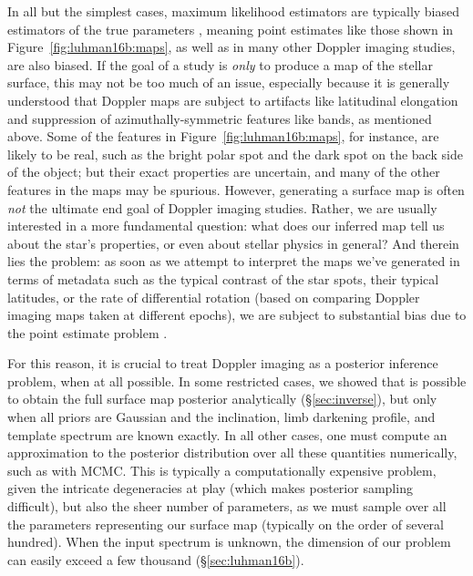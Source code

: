 \documentclass[modern]{aastex631}
\begin{document}
In all but the simplest cases, maximum likelihood estimators are typically biased estimators of the true parameters \citep[e.g.,][]{Lehman1998}, meaning point estimates like those shown in Figure~\ref{fig:luhman16b:maps}, as well as in many other Doppler imaging studies, are also biased.
If the goal of a study is \emph{only} to produce a map of the stellar surface, this may not be too much of an issue, especially because it is generally understood that Doppler maps are subject to artifacts like latitudinal elongation and suppression of azimuthally-symmetric features like bands, as mentioned above.
Some of the features in Figure~\ref{fig:luhman16b:maps}, for instance, are likely to be real, such as the bright polar spot and the dark spot on the back side of the object; but their exact properties are uncertain, and many of the other features in the maps may be spurious.
However, generating a surface map is often \emph{not} the ultimate end goal of Doppler imaging studies.
Rather, we are usually interested in a more fundamental question: what does our inferred map tell us about the star's properties, or even about stellar physics in general?
And therein lies the problem: as soon as we attempt to interpret the maps we've generated in terms of metadata such as the typical contrast of the star spots, their typical latitudes, or  the rate of differential rotation (based on comparing Doppler imaging maps taken at different epochs), we are subject to substantial bias due to the point estimate problem \citep[for an example of this same problem in the context of inferring the exoplanet eccentricity distribution, see][]{Hogg2010}.

For this reason, it is crucial to treat Doppler imaging as a posterior inference problem, when at all possible.
In some restricted cases, we showed that is possible to obtain the full surface map posterior analytically (\S\ref{sec:inverse}), but only when all priors are Gaussian and the inclination, limb darkening profile, and template spectrum are known exactly. 
In all other cases, one must compute an approximation to the posterior distribution over all these quantities numerically, such as with MCMC.
This is typically a computationally expensive problem, given the intricate degeneracies at play (which makes posterior sampling difficult), but also the sheer number of parameters, as we must sample over all the parameters representing our surface map (typically on the order of several hundred). 
When the input spectrum is unknown, the dimension of our problem can easily exceed a few thousand (\S\ref{sec:luhman16b}).
\end{document}
